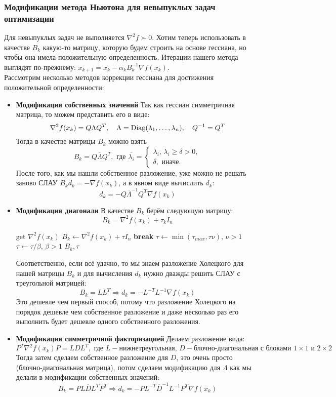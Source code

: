 \subsubsection{Модификации метода Ньютона для невыпуклых задач оптимизации}
Для невыпуклых задач не выполняется $\nabla^2 f \succ 0$. Хотим теперь использовать в качестве $B_k$ какую-то матрицу, которую будем строить на основе гессиана, но чтобы она имела положительную определенность. Итерации нашего метода выглядят по-прежнему: $x_{k+1} = x_k - \alpha_k B_k^{-1}\nabla f(x_k)$. \\
Рассмотрим несколько методов коррекции гессиана для достижения положительной определенности:
\begin{itemize}
	\item \textbf{Модификация собственных значений} Так как гессиан симметричная матрица, то можем представить его в виде:
	\[
		\nabla^2 f(x_k) = Q \Lambda Q^T, \quad \Lambda = \operatorname{Diag}(\lambda_1, \dots, \lambda_n), \quad Q^{-1} = Q^{T}
	\]
	Тогда в качестве матрицы $B_k$ можно взять
	\[
		B_k = Q \overline{\Lambda} Q^{T}, \text{ где } \overline{\lambda_i} = \begin{cases}
		\lambda_i, \, \lambda_i \geq \delta > 0, \\
		\delta, \text{ иначе.}
		\end{cases}
	\]
	После того, как мы нашли собственное разложение, уже можно не решать заново СЛАУ $B_k d_k = -\nabla f(x_k)$, а в явном виде вычислить $d_k$:
	\[
		d_k = - Q \overline{\Lambda}^{-1} Q^{T} \nabla f(x_k)
	\]
	\item \textbf{Модификация диагонали} В качестве $B_k$ берём следующую матрицу:
	\[
		B_k = \nabla^2 f(x_k) + \tau_k I_n
	\]
	\begin{algorithmic}[1]
		\State get $\nabla^2 f(x_k)$
		\State $B_k \gets \nabla^2 f(x_k) + \tau I_n$
			\textbf{break}
		\EndIf
		\State $\tau \gets \min(\tau_{max}, \tau \nu), \, \nu > 1$
		\EndWhile
		\State $\tau \gets \tau / \beta, \, \beta > 1$
		\State \Return $B_k, \tau$
		\EndProcedure
	\end{algorithmic}
	Соответственно, если всё удачно, то мы знаем разложение Холецкого для нашей матрицы $B_k$ и для вычисления $d_k$ нужно дважды решить СЛАУ с треугольной матрицей:
	\[
		B_k = LL^{T} \Rightarrow d_k = - L^{-T} L^{-1} \nabla f(x_k)
	\]
	Это дешевле чем первый способ, потому что разложение Холецкого на порядок дешевле чем собственное разложение и даже несколько раз его выполнить будет дешевле одного собственного разложения.
	\item \textbf{Модификация симметричной факторизацией}
	Делаем разложение вида:
	\[
		P^{T} \nabla^2 f(x_k) P = LDL^{T}, \text{ где } L - \text{нижнетреугольная},\, D - \text{блочно-диагональная с блоками } 1\times1 \text{ и } 2\times2
	\]
	Тогда затем сделаем собственное разложение для $D$, это очень просто (блочно-диагональная матрица), потом сделаем модификацию для $\Lambda$ как мы делали в модификации собственных значений:
	\[
		B_k = PL\overline{D}L^{T}P^{T} \Rightarrow d_k = -PL^{-T}\overline{D}^{-1} L^{-1} P^{T} \nabla f(x_k)
	\]
\end{itemize}

